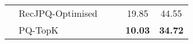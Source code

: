 \begin{tabular}{llcccc}
\multicolumn{1}{l|}{}                                                         & \multicolumn{1}{l|}{RecJPQ-Optimised}                                                    &                                                    &                                                             & 19.85                                                   & 44.55                                                 \\
\multicolumn{1}{l|}{}                                                         & \multicolumn{1}{l|}{PQ-TopK}                                                             &                                                    &                                                             & \textbf{10.03}                                          & \textbf{34.72}                                        \\ \hline
\end{tabular}